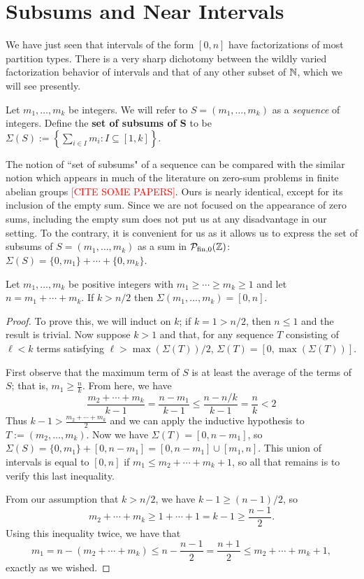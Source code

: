 \section{Subsums and Near Intervals} \label{sec:subsums}
We have just seen that intervals of the form $[ 0,n ]$ have factorizations of most partition types.
There is a very sharp dichotomy between the wildly varied factorization behavior of intervals and that of any other subset of $\mathbb{N}$, which we will see presently.  

\begin{defn}
	Let $m_1,\dots, m_k$ be integers.
	We will refer to $S = (m_1,\dots, m_k)$ as a \textit{sequence} of integers.
	Define the \textbf{set of subsums of S} to be $\Sigma(S) := \left\{ \sum_{i\in I} m_i : I\subseteq [ 1,k ] \right\}$.
\end{defn}

\begin{rk}
	The notion of ``set of subsums" of a sequence can be compared with the similar notion which appears in much of the literature on zero-sum problems in finite abelian groups \textcolor{red}{[CITE SOME PAPERS]}.  
	Ours is nearly identical, except for its inclusion of the empty sum.
	Since we are not focused on the appearance of zero sums, including the empty sum does not put us at any disadvantage in our setting.
	To the contrary, it is convenient for us as it allows us to express the set of subsums of $S = (m_1,\dots, m_k)$ as a sum in $\mathcal{P}_{\textrm{fin}, 0}(\mathbb{Z})$: $\Sigma(S)  = \{0,m_1\} + \cdots +\{0,m_k\}$.
\end{rk}

\begin{lemma} \label{lem:long-partitions}
	Let $m_1,\dots, m_k$ be positive integers with $m_1\ge \cdots \ge m_k \ge 1$ and let $n = m_1 + \cdots + m_k$.
	If $k> n/2$ then $\Sigma(m_1,\dots, m_k) = [ 0,n ]$.
\end{lemma}

\begin{proof}
	To prove this, we will induct on $k$; if $k=1 > n/2$, then $n \le 1$ and the result is trivial.
	Now suppose $k > 1$ and that, for any sequence $T$ consisting of $\ell < k$ terms satisfying $\ell > \max(\Sigma(T))/2$, $\Sigma(T) = [ 0, \max(\Sigma(T)) ]$.
	
	First observe that the maximum term of $S$ is at least the average of the terms of $S$; that is, $m_1 \ge \frac{n}{k}$.
	From here, we have
	\[ \frac{m_2+\cdots + m_k}{k-1} = \frac{n-m_1}{k-1} \le \frac{n-n/k}{k-1} = \frac{n}{k} < 2 \]
	Thus $k - 1 > \frac{m_2+\cdots+m_k}{2}$ and we can apply the inductive hypothesis to $T := (m_2,\dots, m_k)$.
	Now we have $\Sigma(T) = [ 0, n-m_1 ]$, so $\Sigma(S) = \{0,m_1\} + [ 0,n-m_1 ] = [ 0,n-m_1 ] \cup [ m_1,n ]$.
	This union of intervals is equal to $[ 0,n ]$ if $m_1 \le m_2 + \cdots + m_k +1$, so all that remains is to verify this last inequality.
	
	From our assumption that $k > n/2$, we have $k-1 \ge (n-1)/2$, so 
	\[m_2 + \cdots + m_k \ge 1 +\cdots + 1 = k-1 \ge \frac{n-1}{2}.\]
	Using this inequality twice, we have that
	\[m_1 = n - (m_2 + \cdots + m_k) \le n - \frac{n-1}{2} = \frac{n+1}{2} \le m_2 + \cdots + m_k + 1,\]
	exactly as we wished.
\end{proof}

